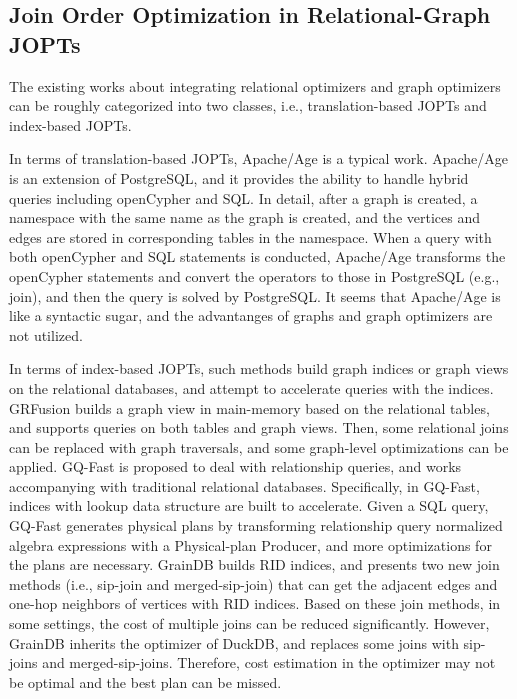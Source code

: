 \documentclass[sigconf, nonacm]{acmart}
\begin{document}
\subsection{Join Order Optimization in Relational-Graph JOPTs}
\label{sec:related-work:ropt-gopt}
The existing works about integrating relational optimizers and graph optimizers can be roughly categorized into two classes, i.e., translation-based JOPTs and index-based JOPTs.

In terms of translation-based JOPTs, Apache/Age \cite{apache-age} is a typical work.
Apache/Age is an extension of PostgreSQL, and it provides the ability to handle hybrid queries including openCypher and SQL.
In detail, after a graph is created, a namespace with the same name as the graph is created, and the vertices and edges are stored in corresponding tables in the namespace.
When a query with both openCypher and SQL statements is conducted, Apache/Age transforms the openCypher statements and convert the operators to those in PostgreSQL (e.g., join), and then the query is solved by PostgreSQL.
It seems that Apache/Age is like a syntactic sugar, and the advantanges of graphs and graph optimizers are not utilized.

In terms of index-based JOPTs, such methods build graph indices or graph views on the relational databases, and attempt to accelerate queries with the indices.
GRFusion \cite{GRFusion} builds a graph view in main-memory based on the relational tables, and supports queries on both tables and graph views.
Then, some relational joins can be replaced with graph traversals, and some graph-level optimizations can be applied.
GQ-Fast \cite{gqfast} is proposed to deal with relationship queries, and works accompanying with traditional relational databases.
Specifically, in GQ-Fast, indices with lookup data structure are built to accelerate.
Given a SQL query, GQ-Fast generates physical plans by transforming relationship query normalized algebra expressions with a Physical-plan Producer, and more optimizations for the plans are necessary.
GrainDB \cite{graindb} builds RID indices, and presents two new join methods (i.e., sip-join and merged-sip-join) that can get the adjacent edges and one-hop neighbors of vertices with RID indices.
Based on these join methods, in some settings, the cost of multiple joins can be reduced significantly.
However, GrainDB inherits the optimizer of DuckDB, and replaces some joins with sip-joins and merged-sip-joins.
Therefore, cost estimation in the optimizer may not be optimal and the best plan can be missed.
\end{document}
